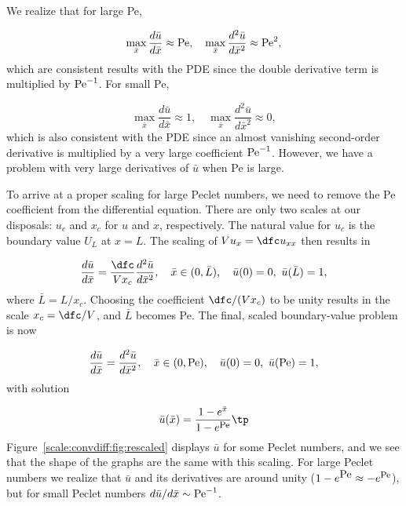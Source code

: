 \documentclass[graybox,envcountchap,sectrefs,final]{svmonodo}
\begin{document}
We realize that for large Pe,

\[ \max_{\bar x}\frac{d\bar u}{d\bar x} \approx \hbox{Pe},\quad
\max_{\bar x}\frac{d^2\bar u}{d\bar x^2} \approx \hbox{Pe}^{2},\]
which are consistent results with the PDE since the double derivative term
is multiplied by $\hbox{Pe}^{-1}$.
For small Pe,

\[ \max_{\bar x}\frac{d\bar u}{d\bar x}\approx 1,\quad
   \max_{\bar x}\frac{d^2\bar u}{d\bar x^2} \approx 0,\]
which is also consistent with the PDE
since an almost vanishing second-order derivative
is multiplied by a very large coefficient $\hbox{Pe}^{-1}$.
However, we have a problem with very large
derivatives of $\bar u$ when Pe is large.

To arrive at a proper scaling for large Peclet numbers,
we need to remove the Pe coefficient
from the differential equation. There are only two scales at our
disposals: $u_c$ and $x_c$ for $u$ and $x$, respectively.
The natural value for $u_c$ is the boundary value $U_L$ at $x=L$.
The scaling of $Vu_x = \dfc u_{xx}$ then results in

\[ \frac{d\bar u}{d\bar x} = \frac{\dfc}{Vx_c}\frac{d^2\bar u}{d\bar x^2},
\quad \bar x\in (0,\bar L),\quad \bar u(0)=0,\ \bar u(\bar L)=1,\]
where $\bar L = L/x_c$. Choosing the coefficient $\dfc/(Vx_c)$ to
be unity results in the scale $x_c=\dfc/V$, and $\bar L$ becomes Pe.
The final, scaled boundary-value
problem is now

\[ \frac{d\bar u}{d\bar x} = \frac{d^2\bar u}{d\bar x^2},
\quad \bar x \in (0, \hbox{Pe}), \quad \bar u(0)=0,\ \bar u(\hbox{Pe})=1,\]
with solution

\[ \bar u(\bar x) = \frac{1 - e^{\bar x}}{1 - e^{\hbox{\footnotesize Pe}}}\tp\]
Figure~\ref{scale:convdiff:fig:rescaled} displays $\bar u$ for some
Peclet numbers, and we see that the shape of the graphs are the same
with this scaling. For large Peclet numbers we realize that $\bar u$
and its derivatives are around unity
($1-e^{\hbox{Pe}}\approx -e^{\hbox{\footnotesize Pe}}$),
but for small Peclet numbers $d\bar u/d\bar x \sim \hbox{Pe}^{-1}$.
\end{document}

